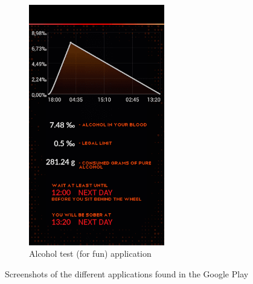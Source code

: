 \begin{figure}[H]
\begin{subfigure}{0.3\textwidth}
      \includegraphics[width=0.65\textwidth]{./img/forfun.png}
      \caption{Alcohol test (for fun) \cite{forfun} application}
      \label{forfun}
  \end{subfigure}
  \caption{Screenshots of the different applications found in the Google Play \cite{googleplay}}
  \label{Screenshots}
\end{figure}

\newpage

